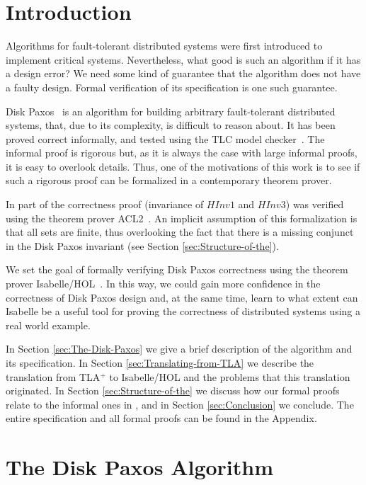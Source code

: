 \section{Introduction}

Algorithms for fault-tolerant distributed systems were first
introduced to implement critical systems. Nevertheless, what good is
such an algorithm if it has a design error? We need some kind of
guarantee that the algorithm does not have a faulty design. Formal
verification of its specification is one such guarantee.

Disk Paxos~\cite{Gafni00disk} is an algorithm for building arbitrary
fault-tolerant distributed systems, that, due to its complexity, is
difficult to reason about. It has been proved correct informally, and
tested using the TLC model checker~\cite{LamportTLA:2002}. The
informal proof is rigorous but, as it is always the case with large
informal proofs, it is easy to overlook details. Thus, one of the
motivations of this work is to see if such a rigorous proof can be
formalized in a contemporary theorem prover.

In \cite{Pacheco-reasoning} part of the correctness proof (invariance
of \tla $HInv1$ and $HInv3$) \notla was verified using the theorem
prover ACL2~\cite{ACLBook}. An implicit assumption of this formalization is
that all sets are finite, thus overlooking the fact that there is a
missing conjunct in the Disk Paxos invariant 
(see Section \ref{sec:Structure-of-the}).

We set the goal of formally verifying Disk Paxos correctness using the
theorem prover Isabelle/HOL~\cite{Nipkow-Paulson-Wenzel:2002}.  In
this way, we could gain more confidence in the correctness of Disk
Paxos design and, at the same time, learn to what extent can Isabelle
be a useful tool for proving the correctness of distributed systems
using a real world example.

In Section \ref{sec:The-Disk-Paxos} we give a brief description of the
algorithm and its specification. In Section
\ref{sec:Translating-from-TLA} we describe the translation from
TLA$^{+}$ to Isabelle/HOL and the problems that this translation
originated. In Section \ref{sec:Structure-of-the} we discuss how our
formal proofs relate to the informal ones in \cite{Gafni00disk}, and
in Section \ref{sec:Conclusion} we conclude. The entire specification
and all formal proofs can be found in the Appendix.


\section{The Disk Paxos Algorithm\label{sec:The-Disk-Paxos}}

